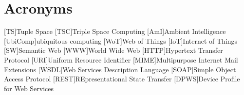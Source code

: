 


\chapter*{Acronyms}

\begin{acronym}
  [TS]{Tuple Space}
  [TSC]{Triple Space Computing}
  [AmI]{Ambient Intelligence}
  [UbiComp]{ubiquitous computing}
  [WoT]{Web of Things}
  [IoT]{Internet of Things}
  [SW]{Semantic Web}
  [WWW]{World Wide Web} %
  [HTTP]{Hypertext Transfer Protocol}
  [URI]{Uniform Resource Identifier}
  [MIME]{Multipurpose Internet Mail Extensions}
  [WSDL]{Web Services Description Language}
  [SOAP]{Simple Object Access Protocol}
  [REST]{REpresentational State Transfer} %
  [DPWS]{Device Profile for Web Services}
\end{acronym}

